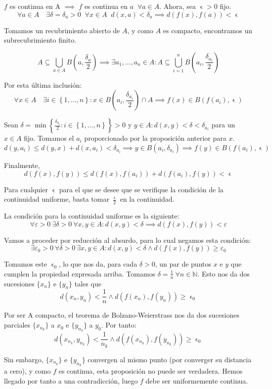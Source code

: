 \documentclass[11pt, a4paper, titlepage]{article}
\makeatletter
\let\epsilon\upvarepsilon
\renewenvironment{proof}[1][\proofname] {\vspace{-15pt}\par\pushQED{\qed}\normalfont\topsep6\p@\@plus6\p@\relax\trivlist\item[\hskip\labelsep\it#1\@addpunct{.}]\ignorespaces}{\popQED\endtrivlist\@endpefalse}
\newcommand\ddfrac[2]{\frac{\displaystyle #1}{\displaystyle #2}}
\theoremstyle{theorem-style}
\theoremstyle{definition-style}
\theoremstyle{remark-style}
\theoremstyle{example-style}
\makeatother
\begin{document}
\begin{proof}
	$f$ es continua en A $\implies$ $f$ es continua en $a\;\; \forall a \in A$. Ahora, sea $\epsilon>0$ fijo.
	\[
	    \forall a \in A \quad \exists \delta = \delta_a > 0\;\; \forall x\in A\;\; d(x,a) < \delta_a \implies d(f(x),f(a))<\epsilon
	\]

	Tomamos un recubrimiento abierto de $A$, y como $A$ es compacto, encontramos un subrecubrimiento finito.
	
	\[
		A \subseteq \bigcup_{a\in A} B(a, \frac{\delta_a}{2}) \implies \exists a_1,\dots,a_n \in A: A \subseteq \bigcup_{i=1}^n B\left(a_i, \frac{\delta_{a_i}}{2}\right)
	\]
	
	Por esta última inclusión:
	\[
		\forall x\in A\quad \exists i \in \left \{ 1,\dots,n \right \} : x\in B\left(a_i,\frac{\delta_{a_i}}{2}\right)\cap A \implies f(x)\in B(f(a_i),\epsilon)
	\]
	
	Sean $\delta = \min\left\{\ddfrac{\delta_{a_i}}{2} : i \in \left \{ 1,\dots,n \right \}\right\} > 0$ y $y\in A : d(x,y) < \delta < \delta_{a_i}$ para un $x\in A$ fijo. Tomamos el $a_i$ proporcionado por la proposición anterior para $x$.
	\[
		d(y,a_i) \le d(y,x)+d(x,a_i) < \delta_{a_i} \implies y\in B(a_i,\delta_{a_i}) \implies f(y) \in B(f(a_i), \epsilon)
	\]
	
	Finalmente,
	\[
		d(f(x), f(y)) \le d(f(x),f(a_i)) + d(f(a_i), f(y)) < \epsilon
	\]
	
	Para cualquier $\epsilon$ para el que se desee que se verifique la condición de la continuidad uniforme, basta tomar $\ddfrac{\epsilon}{2}$ en la continuidad.
\end{proof}

\begin{proof}[Demostración alternativa]
	La condición para la continuidad uniforme es la siguiente:
	\[
		\forall \varepsilon > 0 \  \exists \delta > 0 \ \forall x, y \in A : d(x,y) < \delta \implies d (f(x) , f(y) ) < \varepsilon
	\]
	
	Vamos a proceder por reducción al absurdo, para lo cual negamos esta condición:
	\[
		\exists \varepsilon_0 > 0 \ \forall \delta > 0 \ \exists x, y \in A : d (x,y) < \delta \wedge d (f(x) , f(y) ) \ge \varepsilon_0
	\]
	
	Tomamos este $\epsilon_0$, lo que nos da, para cada $\delta>0$, un par de puntos $x$ e $y$ que cumplen la propiedad expresada arriba. Tomamos $\delta = \frac{1}{n} \ \forall n\in \mathbb{N}$. Esto nos da dos sucesiones $\{x_n\}$ e $\{y_n\}$ tales que
	\[
		d(x_n,y_n) < \frac{1}{n} \wedge d(f(x_n),f(y_n)) \ge \epsilon_0
	\]
	
	Por ser A compacto, el teorema de Bolzano-Weierstrass nos da dos sucesiones parciales $\{x_{n_k}\}$ a $x_0$ e $\{y_{n_k}\}$ a $y_0$. Por tanto:
	\[
		d(x_{n_k},y_{n_k}) < \frac{1}{n_k} \wedge d(f(x_{n_k}),f(y_{n_k})) \ge \epsilon_0
	\]
	
	Sin embargo, $\{x_{n_k}\}$ e $\{y_{n_k}\}$ convergen al mismo punto (por converger su distancia a cero), y como $f$ es continua, esta proposición no puede ser verdadera. Hemos llegado por tanto a una contradicción, luego $f$ debe ser uniformemente continua.
\end{proof}
\end{document}
